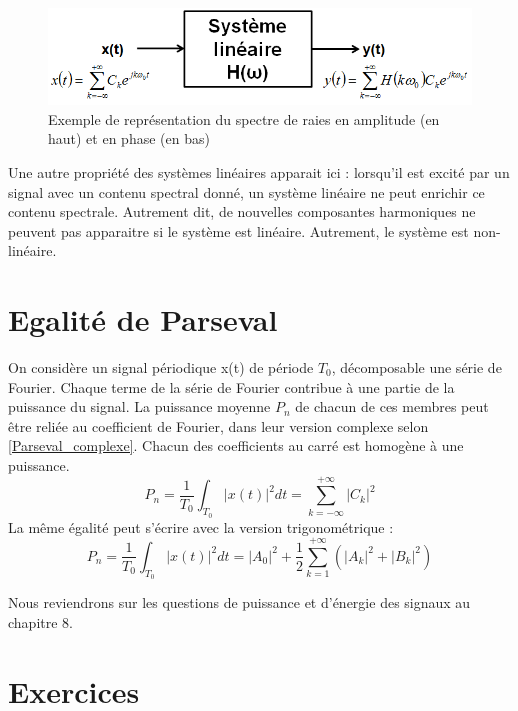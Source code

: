 	 \begin{figure}[h!]
	 	\centering
	 	\includegraphics[scale=0.6]{images/LTI_serie_Fourier.png}
	 	\caption{Exemple de représentation du spectre de raies en amplitude (en haut) et en phase (en bas)}	
	 	\label{Fig:Excitation d'un système linéaire par un signal périodique} 
	 \end{figure}
	 
	Une autre propriété des systèmes linéaires apparait ici : lorsqu'il est excité par un signal avec un contenu spectral donné, un système linéaire ne peut enrichir ce contenu spectrale. Autrement dit, de nouvelles composantes harmoniques ne peuvent pas apparaitre si le système est linéaire. Autrement, le système est non-linéaire.
	 
	 
	 
	
	\section{Egalité de Parseval}
	
	On considère un signal périodique x(t) de période $T_{0}$, décomposable  une série de Fourier. Chaque terme de la série de Fourier contribue à une partie de la puissance du signal. La puissance moyenne $P_{n}$ de chacun de ces membres peut être reliée au coefficient de Fourier, dans leur version complexe selon \ref{Parseval_complexe}. Chacun des coefficients au carré est homogène à une puissance.
	\begin{equation}\label{Parseval_complexe}
	P_{n}=\frac{1}{T_{0}}\int_{T_{0}}|x(t)|^{2}dt=\sum_{k=-\infty}^{+\infty}|C_k|^{2}
	\end{equation}
	La même égalité peut s'écrire avec la version trigonométrique : 
	\begin{equation}\label{Parseval_trigo}
	P_{n}=\frac{1}{T_{0}}\int_{T_{0}}|x(t)|^{2}dt=|A_0|^{2}+\frac{1}{2}\sum_{k=1}^{+\infty}(|A_k|^{2}+|B_k|^{2})
	\end{equation}

	
	Nous reviendrons sur les questions de puissance et d'énergie des signaux au chapitre 8.\\
	
	
	\section{Exercices}
	
